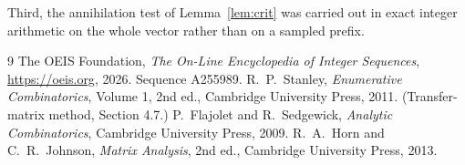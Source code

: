 \documentclass[11pt,a4paper]{article}
\theoremstyle{plain}
\theoremstyle{definition}
\begin{document}
Third, the annihilation test of Lemma~\ref{lem:crit} was carried out in exact integer
arithmetic on the whole vector rather than on a sampled prefix.

\begin{thebibliography}{9}
 The OEIS Foundation, \emph{The On-Line Encyclopedia of Integer
Sequences}, \url{https://oeis.org}, 2026. Sequence A255989.
 R.~P.~Stanley, \emph{Enumerative Combinatorics}, Volume 1, 2nd ed.,
Cambridge University Press, 2011. (Transfer-matrix method, Section 4.7.)
 P.~Flajolet and R.~Sedgewick, \emph{Analytic Combinatorics}, Cambridge
University Press, 2009.
 R.~A.~Horn and C.~R.~Johnson, \emph{Matrix Analysis}, 2nd ed., Cambridge
University Press, 2013.
\end{thebibliography}
\end{document}
